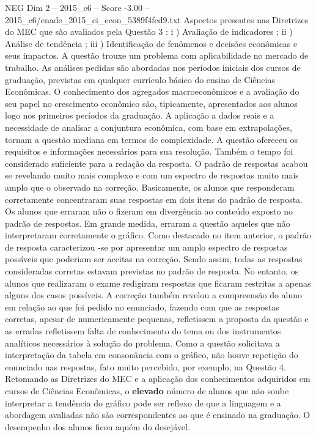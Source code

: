 \begin{textsample}{NEG Dim 2 – 2015\_c6 – Score -3.00 – 2015\_c6/enade\_2015\_ci\_econ\_5389f4fcd9.txt}
Aspectos presentes nas Diretrizes do MEC que são avaliados pela Questão 3 : i ) Avaliação de indicadores ; ii ) Análise de tendência ; iii ) Identificação de fenômenos e decisões econômicas e seus impactos.
A questão trouxe um problema com aplicabilidade no mercado de trabalho.
As análises pedidas são abordadas nos períodos iniciais dos cursos de graduação, previstas em qualquer currículo básico do ensino de Ciências Econômicas.
O conhecimento dos agregados macroeconômicos e a avaliação do seu papel no crescimento econômico são, tipicamente, apresentados aos alunos logo nos primeiros períodos da graduação.
A aplicação a dados reais e a necessidade de analisar a conjuntura econômica, com base em extrapolações, tornam a questão mediana em termos de complexidade.
A questão ofereceu os requisitos e informações necessários para sua resolução.
Também o tempo foi considerado suficiente para a redação da resposta.
O padrão de respostas acabou se revelando muito mais complexo e com um espectro de respostas muito mais amplo que o observado na correção.
Basicamente, os alunos que responderam corretamente concentraram suas respostas em dois itens do padrão de resposta.
Os alunos que erraram não o fizeram em divergência ao conteúdo exposto no padrão de respostas.
Em grande medida, erraram a questão aqueles que não interpretaram corretamente o gráfico.
Como destacado no item anterior, o padrão de resposta caracterizou -se por apresentar um amplo espectro de respostas possíveis que poderiam ser aceitas na correção.
Sendo assim, todas as respostas consideradas corretas estavam previstas no padrão de resposta.
No entanto, os alunos que realizaram o exame redigiram respostas que ficaram restritas a apenas alguns dos casos possíveis.
A correção também revelou a compreensão do aluno em relação ao que foi pedido no enunciado, fazendo com que as respostas corretas, apesar de numericamente pequenas, refletissem a proposta da questão e as erradas refletissem falta de conhecimento do tema ou dos instrumentos analíticos necessários à solução do problema.
Como a questão solicitava a interpretação da tabela em consonância com o gráfico, não houve repetição do enunciado nas respostas, fato muito percebido, por exemplo, na Questão 4.
Retomando as Diretrizes do MEC e a aplicação dos conhecimentos adquiridos em cursos de Ciências Econômicas, o \textbf{elevado} número de alunos que não soube interpretar a tendência do gráfico pode ser reflexo de que a linguagem e a abordagem avaliadas não são correspondentes ao que é ensinado na graduação.
O desempenho dos alunos ficou aquém do desejável.

\end{textsample}
